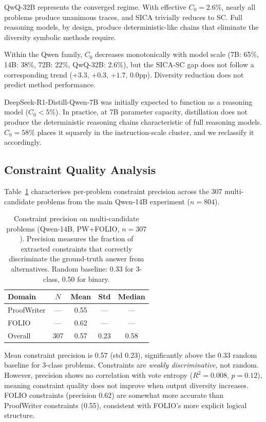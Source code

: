 \documentclass[11pt]{article}
\begin{document}
QwQ-32B represents the converged regime.
With effective $C_0{=}2.6\%$, nearly all problems produce unanimous traces, and SICA trivially reduces to SC.
Full reasoning models, by design, produce deterministic-like chains that eliminate the diversity symbolic methods require.

Within the Qwen family, $C_0$ decreases monotonically with model scale (7B: 65\%, 14B: 38\%, 72B: 22\%, QwQ-32B: 2.6\%), but the SICA-SC gap does not follow a corresponding trend ($+3.3$, $+0.3$, $+1.7$, $0.0$pp).
Diversity reduction does not predict method performance.

DeepSeek-R1-Distill-Qwen-7B was initially expected to function as a reasoning model ($C_0{<}5\%$).
In practice, at 7B parameter capacity, distillation does not produce the deterministic reasoning chains characteristic of full reasoning models.
$C_0{=}58\%$ places it squarely in the instruction-scale cluster, and we reclassify it accordingly.

\subsection{Constraint Quality Analysis}
\label{sec:quality}

Table~\ref{tab:quality} characterises per-problem constraint precision across the 307 multi-candidate problems from the main Qwen-14B experiment ($n{=}804$).

\begin{table}[t]
\centering
\caption{Constraint precision on multi-candidate problems (Qwen-14B, PW+FOLIO, $n{=}307$). Precision measures the fraction of extracted constraints that correctly discriminate the ground-truth answer from alternatives. Random baseline: 0.33 for 3-class, 0.50 for binary.}
\label{tab:quality}
\small
\begin{tabular}{@{}lcccc@{}}
\toprule
Domain & $N$ & Mean & Std & Median \\
\midrule
ProofWriter & --- & 0.55 & --- & --- \\
FOLIO & --- & 0.62 & --- & --- \\
\midrule
Overall & 307 & 0.57 & 0.23 & 0.58 \\
\bottomrule
\end{tabular}
\end{table}

Mean constraint precision is 0.57 (std 0.23), significantly above the 0.33 random baseline for 3-class problems.
Constraints are \emph{weakly discriminative}, not random.
However, precision shows no correlation with vote entropy ($R^2{=}0.008$, $p{=}0.12$), meaning constraint quality does not improve when output diversity increases.
FOLIO constraints (precision 0.62) are somewhat more accurate than ProofWriter constraints (0.55), consistent with FOLIO's more explicit logical structure.
\end{document}
